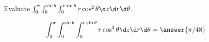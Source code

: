 \documentclass{ximera}
\author{David Guichard \and Neal Koblitz \and H. Jerome Keisler \and Albert Scheller \and Barry Balof \and Mike Wills \and Matthew Carr}
\begin{document}
\begin{exercise}





Evaluate  $\int_{0}^{\pi}\int_{0}^{\sin\theta}\int_{0}^{r\sin\theta}r\cos^{2}\theta \d z\d r\d \theta$.

\begin{prompt}
\[
\int_{0}^{\pi}\int_{0}^{\sin\theta}\int_{0}^{r\sin\theta}r\cos^{2}\theta \d z\d r\d \theta=\answer{\pi/48}
\]
\end{prompt}



\end{exercise}
\end{document}
